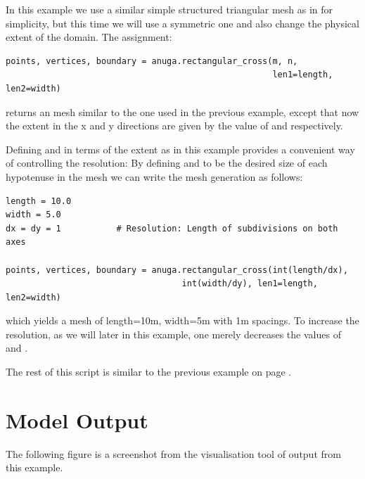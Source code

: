 \documentclass{manual}
\begin{document}
In this example we use a similar simple structured triangular mesh 
as in 
for simplicity, but this time we will use a symmetric one and also
change the physical extent of the domain. The assignment:

\begin{verbatim}
points, vertices, boundary = anuga.rectangular_cross(m, n, 
                                                     len1=length, len2=width)
\end{verbatim}

returns an  mesh similar to the one used in the previous example, except that now the
extent in the x and y directions are given by the value of  and 
respectively.

Defining  and  in terms of the extent as in this example provides a convenient way of
controlling the resolution: By defining  and  to be the desired size of each
hypotenuse in the mesh we can write the mesh generation as follows:

\begin{verbatim}
length = 10.0
width = 5.0
dx = dy = 1           # Resolution: Length of subdivisions on both axes

points, vertices, boundary = anuga.rectangular_cross(int(length/dx), 
                                   int(width/dy), len1=length, len2=width)
\end{verbatim}

which yields a mesh of length=10m, width=5m with 1m spacings. To increase the resolution,
as we will later in this example, one merely decreases the values of  and .

The rest of this script is similar to the previous example on page \pageref{ref:runup_py_code}.

\section{Model Output}

The following figure is a screenshot from the \anuga visualisation
tool  of output from this example.
\end{document}
